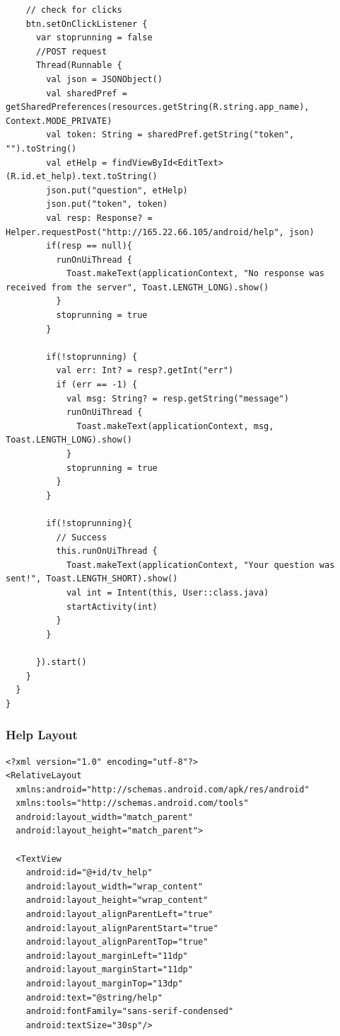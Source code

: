 \documentclass[11pt, a4paper]{article}
\begin{document}
\begin{appendices}
\begin{lstlisting}
    // check for clicks
    btn.setOnClickListener {
      var stoprunning = false
      //POST request
      Thread(Runnable {
        val json = JSONObject()
        val sharedPref = getSharedPreferences(resources.getString(R.string.app_name), Context.MODE_PRIVATE)
        val token: String = sharedPref.getString("token", "").toString()
        val etHelp = findViewById<EditText>(R.id.et_help).text.toString()
        json.put("question", etHelp)
        json.put("token", token)
        val resp: Response? = Helper.requestPost("http://165.22.66.105/android/help", json)
        if(resp == null){
          runOnUiThread {
            Toast.makeText(applicationContext, "No response was received from the server", Toast.LENGTH_LONG).show()
          }
          stoprunning = true
        }

        if(!stoprunning) {
          val err: Int? = resp?.getInt("err")
          if (err == -1) {
            val msg: String? = resp.getString("message")
            runOnUiThread {
              Toast.makeText(applicationContext, msg, Toast.LENGTH_LONG).show()
            }
            stoprunning = true
          }
        }

        if(!stoprunning){
          // Success
          this.runOnUiThread {
            Toast.makeText(applicationContext, "Your question was sent!", Toast.LENGTH_SHORT).show()
            val int = Intent(this, User::class.java)
            startActivity(int)
          }
        }

      }).start()
    }
  }
}
\end{lstlisting}
\subsubsection{Help Layout}
\begin{lstlisting}
<?xml version="1.0" encoding="utf-8"?>
<RelativeLayout
  xmlns:android="http://schemas.android.com/apk/res/android"
  xmlns:tools="http://schemas.android.com/tools"
  android:layout_width="match_parent"
  android:layout_height="match_parent">

  <TextView
    android:id="@+id/tv_help"
    android:layout_width="wrap_content"
    android:layout_height="wrap_content"
    android:layout_alignParentLeft="true"
    android:layout_alignParentStart="true"
    android:layout_alignParentTop="true"
    android:layout_marginLeft="11dp"
    android:layout_marginStart="11dp"
    android:layout_marginTop="13dp"
    android:text="@string/help"
    android:fontFamily="sans-serif-condensed"
    android:textSize="30sp"/>


\end{lstlisting}
\end{appendices}
\end{document}
